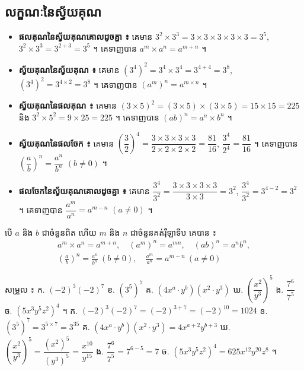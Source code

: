 \subsection{លក្ខណៈនៃស្វ័យគុណ}
\begin{itemize}
  \item \textbf{ផលគុណនៃស្វ័យគុណគោលដូចគ្នា ៖} គេមាន $3^2\times 3^3 = 3\times 3\times 3\times 3\times 3 = 3^5$, $3^2\times 3^3 = 3^{2+3} = 3^5$ ។ គេទាញបាន $a^m\times a^n = a^{m+n}$ ។
  \item \textbf{ស្វ័យគុណនៃស្វ័យគុណ ៖} គេមាន $(3^4)^2 = 3^4\times 3^4 = 3^{4+4} = 3^8$, $(3^4)^2 = 3^{4\times 2} = 3^8$ ។ គេទាញបាន $(a^m)^n = a^{m\times n}$ ។
  \item \textbf{ស្វ័យគុណនៃផលគុណ ៖} គេមាន $(3\times 5)^2 = (3\times 5)\times(3\times 5) = 15\times 15 = 225$ និង $3^2\times 5^2 = 9\times 25 = 225$ ។ គេទាញបាន $(ab)^n = a^n\times b^n$ ។
  \item \textbf{ស្វ័យគុណនៃផលចែក ៖} គេមាន $\left(\dfrac{3}{2}\right)^4 = \dfrac{3\times 3\times 3\times 3}{2\times 2\times 2\times 2} = \dfrac{81}{16}$, $\dfrac{3^4}{2^4} = \dfrac{81}{16}$ ។ គេទាញបាន $\left(\dfrac{a}{b}\right)^n = \dfrac{a^n}{b^n}$ $(b \ne 0)$ ។
  \item \textbf{ផលចែកនៃស្វ័យគុណគោលដូចគ្នា ៖} គេមាន $\dfrac{3^4}{3^2} = \dfrac{3\times 3\times 3\times 3}{3\times 3} = 3^2$, $\dfrac{3^4}{3^2} = 3^{4-2} = 3^2$ ។ គេទាញបាន $\dfrac{a^m}{a^n} = a^{m-n}$ $(a \ne 0)$ ។
\end{itemize}

\begin{formulaBox}[ជាទូទៅ]
បើ $a$ និង $b$ ជាចំនួនពិត ហើយ $m$ និង $n$ ជាចំនួនគត់រ៉ឺឡាទីប គេបាន ៖
\[
\begin{gathered}
a^m\times a^n = a^{m+n}, \quad (a^m)^n = a^{mn}, \quad (ab)^n = a^nb^n,\\
\left(\frac{a}{b}\right)^n = \frac{a^n}{b^n}\ (b \ne 0), \quad \frac{a^m}{a^n} = a^{m-n}\ (a \ne 0)
\end{gathered}
\]
\end{formulaBox}

\begin{example}[លំហាត់គំរូ]
សម្រួល ៖ \quad ក. $(-2)^3(-2)^7$ \quad ខ. $(3^5)^7$ \quad គ. $(4x^a\cdot y^b)(x^2\cdot y^3)$ \quad ឃ. $\left(\dfrac{x^2}{y^3}\right)^5$ \quad ង. $\dfrac{7^6}{7^5}$ \quad ច. $(5x^3y^5z^2)^4$ ។
\ans
ក. $(-2)^3(-2)^7 = (-2)^{3+7} = (-2)^{10} = 1024$ \quad ខ. $(3^5)^7 = 3^{5\times 7} = 3^{35}$ \quad គ. $(4x^a\cdot y^b)(x^2\cdot y^3) = 4x^{a+2}y^{b+3}$ \quad ឃ. $\left(\dfrac{x^2}{y^3}\right)^5 = \dfrac{(x^2)^5}{(y^3)^5} = \dfrac{x^{10}}{y^{15}}$ \quad ង. $\dfrac{7^6}{7^5} = 7^{6-5} = 7$ \quad ច. $(5x^3y^5z^2)^4 = 625x^{12}y^{20}z^8$ ។
\end{example}


